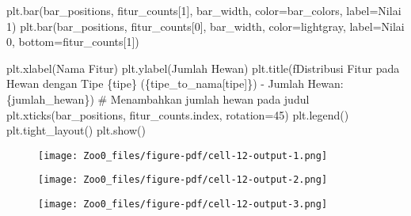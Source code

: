 \documentclass[
  letterpaper,
]{krantz}
\makeatletter
\newenvironment{Shaded}{\begin{snugshade}}{\end{snugshade}}
\newcommand{\CommentTok}[1]{\textcolor[rgb]{0.37,0.37,0.37}{#1}}
\newcommand{\DecValTok}[1]{\textcolor[rgb]{0.68,0.00,0.00}{#1}}
\newcommand{\NormalTok}[1]{\textcolor[rgb]{0.00,0.23,0.31}{#1}}
\newcommand{\OperatorTok}[1]{\textcolor[rgb]{0.37,0.37,0.37}{#1}}
\newcommand{\SpecialCharTok}[1]{\textcolor[rgb]{0.37,0.37,0.37}{#1}}
\newcommand{\SpecialStringTok}[1]{\textcolor[rgb]{0.13,0.47,0.30}{#1}}
\newcommand{\StringTok}[1]{\textcolor[rgb]{0.13,0.47,0.30}{#1}}
\newenvironment{kframe}{%
\medskip{}
\setlength{\fboxsep}{.8em}
 \def\at@end@of@kframe{}%
 \ifinner\ifhmode%
  \def\at@end@of@kframe{\end{minipage}}%
  \begin{minipage}{\columnwidth}%
 \fi\fi%
 \def\FrameCommand##1{\hskip\@totalleftmargin \hskip-\fboxsep
 \colorbox{shadecolor}{##1}\hskip-\fboxsep
     \hskip-\linewidth \hskip-\@totalleftmargin \hskip\columnwidth}%
 \MakeFramed {\advance\hsize-\width
   \@totalleftmargin\z@ \linewidth\hsize
   \@setminipage}}%
 {\par\unskip\endMakeFramed%
 \at@end@of@kframe}
\renewenvironment{Shaded}{\begin{kframe}}{\end{kframe}}
\makeatother
\begin{document}
\begin{Shaded}
\begin{Highlighting}[]
\NormalTok{    plt.bar(bar\_positions, fitur\_counts[}\DecValTok{1}\NormalTok{], bar\_width, color}\OperatorTok{=}\NormalTok{bar\_colors, label}\OperatorTok{=}\StringTok{\textquotesingle{}Nilai 1\textquotesingle{}}\NormalTok{)}
\NormalTok{    plt.bar(bar\_positions, fitur\_counts[}\DecValTok{0}\NormalTok{], bar\_width, color}\OperatorTok{=}\StringTok{\textquotesingle{}lightgray\textquotesingle{}}\NormalTok{, label}\OperatorTok{=}\StringTok{\textquotesingle{}Nilai 0\textquotesingle{}}\NormalTok{, bottom}\OperatorTok{=}\NormalTok{fitur\_counts[}\DecValTok{1}\NormalTok{])}

\NormalTok{    plt.xlabel(}\StringTok{\textquotesingle{}Nama Fitur\textquotesingle{}}\NormalTok{)}
\NormalTok{    plt.ylabel(}\StringTok{\textquotesingle{}Jumlah Hewan\textquotesingle{}}\NormalTok{)}
\NormalTok{    plt.title(}\SpecialStringTok{f\textquotesingle{}Distribusi Fitur pada Hewan dengan Tipe }\SpecialCharTok{\{}\NormalTok{tipe}\SpecialCharTok{\}}\SpecialStringTok{ (}\SpecialCharTok{\{}\NormalTok{tipe\_to\_nama[tipe]}\SpecialCharTok{\}}\SpecialStringTok{) {-} Jumlah Hewan: }\SpecialCharTok{\{}\NormalTok{jumlah\_hewan}\SpecialCharTok{\}}\SpecialStringTok{\textquotesingle{}}\NormalTok{)  }\CommentTok{\# Menambahkan jumlah hewan pada judul}
\NormalTok{    plt.xticks(bar\_positions, fitur\_counts.index, rotation}\OperatorTok{=}\DecValTok{45}\NormalTok{)}
\NormalTok{    plt.legend()}
\NormalTok{    plt.tight\_layout()}
\NormalTok{    plt.show()}
\end{Highlighting}
\end{Shaded}

\begin{figure}[H]

{\centering \texttt{[image: Zoo0\_files/figure-pdf/cell-12-output-1.png]}

}

\end{figure}

\begin{figure}[H]

{\centering \texttt{[image: Zoo0\_files/figure-pdf/cell-12-output-2.png]}

}

\end{figure}

\begin{figure}[H]

{\centering \texttt{[image: Zoo0\_files/figure-pdf/cell-12-output-3.png]}

}

\end{figure}
\end{document}

